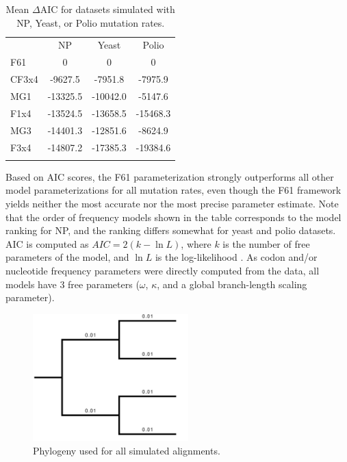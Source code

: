 \documentclass[11pt]{article}
\begin{document}
\begin{table}[htbp]
	\caption {\label{tab:dAIC} Mean $\Delta$AIC for datasets simulated with NP, Yeast, or Polio mutation rates.}
	\begin{tabular}{l c c c}
		\hline\noalign{\smallskip}
		\multicolumn{1}{c}{Frequencies} & NP & Yeast & Polio \\
		\noalign{\smallskip}\hline\noalign{\smallskip}
		F61 & 0 & 0 & 0 \\ 
		CF3x4 & -9627.5 & -7951.8 & -7975.9 \\ 
		MG1 & -13325.5 & -10042.0 & -5147.6 \\ 
		F1x4 & -13524.5 & -13658.5 & -15468.3 \\ 
		MG3 & -14401.3 & -12851.6 & -8624.9 \\ 
		F3x4 & -14807.2 & -17385.3 & -19384.6 \\ 
		\noalign{\smallskip}\hline\noalign{\smallskip} 
	\end{tabular}
	Based on AIC scores, the F61 parameterization strongly outperforms all other model parameterizations for all mutation rates, even though the F61 framework yields neither the most accurate nor the most precise parameter estimate. Note that the order of frequency models shown in the table corresponds to the model ranking for NP, and the ranking differs somewhat for yeast and polio datasets. AIC is computed as $AIC = 2(k - \ln L)$, where $k$ is the number of free parameters of the model, and $\ln L$ is the log-likelihood \cite{Akaike1974,BurnhamAnderson2004}. As codon and/or nucleotide frequency parameters were directly computed from the data, all models have 3 free parameters ($\omega$, $\kappa$, and a global branch-length scaling parameter).
\end{table}

\vspace{2cm}


\begin{figure}[htbp]
	\centerline{\includegraphics[width=6cm]{figures/MainText/simtree.pdf}}
	\caption{\label{tree} Phylogeny used for all simulated alignments.}	
\end{figure}
\end{document}
